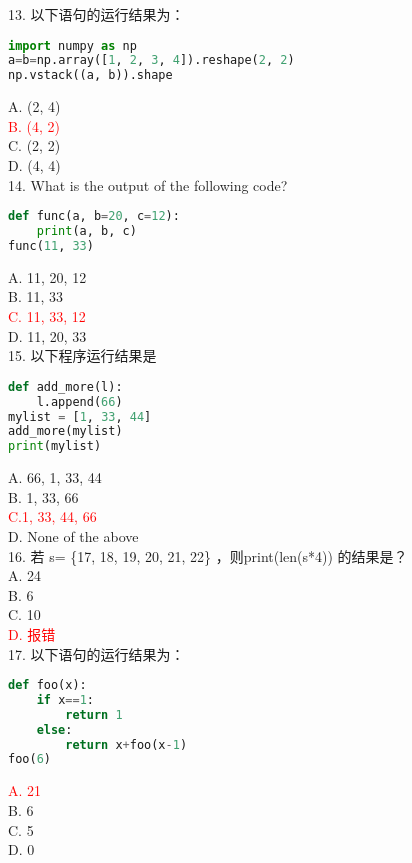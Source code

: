 \documentclass[6pt]{article}
\begin{document}
13. 以下语句的运行结果为：\\

\begin{lstlisting}[language=Python]
import numpy as np
a=b=np.array([1, 2, 3, 4]).reshape(2, 2)
np.vstack((a, b)).shape
\end{lstlisting}
A. (2, 4)\\
\textcolor{red}{B. (4, 2)}\\
C. (2, 2)\\
D. (4, 4)\\



14. What is the output of the following code?\\
\begin{lstlisting}[language=Python]
def func(a, b=20, c=12):
	print(a, b, c)
func(11, 33)
\end{lstlisting}
A. 11, 20, 12\\
B. 11, 33\\
\textcolor{red}{C. 11, 33, 12}\\
D. 11, 20, 33\\


15. 以下程序运行结果是\\

\begin{lstlisting}[language=Python]
def add_more(l): 
    l.append(66)   
mylist = [1, 33, 44] 
add_more(mylist)
print(mylist)
\end{lstlisting}
A.	66, 1, 33, 44\\
B.	1, 33, 66\\
\textcolor{red}{C.1, 33, 44, 66}\\
D.	None of the above\\

16.   若 s= \{17, 18, 19, 20, 21, 22\} ，则print(len(s*4)) 的结果是？\\

A.	24   \\
B.	6    \\
C.	10     \\
\textcolor{red}{D.	报错}\\


17. 以下语句的运行结果为：\\

\begin{lstlisting}[language=Python]
def foo(x):
	if x==1:
		return 1
	else:
  		return x+foo(x-1)
foo(6)
\end{lstlisting}
\textcolor{red}{A. 21}\\
B. 6\\
C. 5\\
D. 0\\
\end{document}
